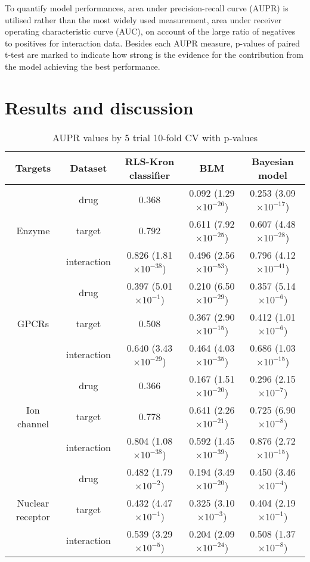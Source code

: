 \documentclass[a4paper,12pt]{report}
\begin{document}
To quantify model performances, area under precision-recall curve (AUPR) is utilised rather than the most widely used measurement, area under receiver operating characteristic curve (AUC), on account of the large ratio of negatives to positives for interaction data. Besides each AUPR measure, p-values of paired t-test are marked to indicate how strong is the evidence for the contribution from the model achieving the best performance. 

\section{Results and discussion}

\begin{table}[h]
\begin{tabular}{ccccc}\hline
Targets & Dataset & RLS-Kron classifier & BLM & Bayesian model \\ \hline
\multirow{3}{*}{Enzyme} & drug & 0.368 & 0.092 (1.29 $\times 10^{-26}$) & 0.253 (3.09 $\times 10^{-17}$) \\
& target & 0.792 & 0.611 (7.92 $\times 10^{-25}$) & 0.607 (4.48 $\times 10^{-28}$) \\
& interaction & 0.826 (1.81 $\times 10^{-38}$) & 0.496 (2.56 $\times 10^{-53}$) & 0.796 (4.12 $\times 10^{-41}$) \\ \hline
\multirow{3}{*}{GPCRs} & drug & 0.397 (5.01 $\times 10^{-1}$) & 0.210 (6.50 $\times 10^{-29}$) & 0.357 (5.14 $\times 10^{-6}$) \\
& target & 0.508 & 0.367 (2.90 $\times 10^{-15}$) & 0.412 (1.01 $\times 10^{-6}$) \\
& interaction & 0.640 (3.43 $\times 10^{-29}$) & 0.464 (4.03 $\times 10^{-35}$) & 0.686 (1.03 $\times 10^{-15}$) \\ \hline
\multirow{3}{*}{Ion channel} & drug & 0.366 & 0.167 (1.51 $\times 10^{-20}$) & 0.296 (2.15 $\times 10^{-7}$) \\
& target & 0.778 & 0.641 (2.26 $\times 10^{-21}$) & 0.725 (6.90 $\times 10^{-8}$) \\
& interaction & 0.804 (1.08 $\times 10^{-38}$) & 0.592 (1.45 $\times 10^{-39}$) & 0.876 (2.72 $\times 10^{-15}$) \\ \hline
\multirow{3}{*}{Nuclear receptor} & drug & 0.482 (1.79 $\times 10^{-2}$) & 0.194 (3.49 $\times 10^{-20}$) & 0.450 (3.46 $\times 10^{-4}$) \\
& target & 0.432 (4.47 $\times 10^{-1}$) & 0.325 (3.10 $\times 10^{-3}$) & 0.404 (2.19 $\times 10^{-1}$) \\
& interaction & 0.539 (3.29 $\times 10^{-5}$) & 0.204 (2.09 $\times 10^{-24}$) & 0.508 (1.37 $\times 10^{-8}$) \\ \hline
\end{tabular}
\caption{AUPR values by 5 trial 10-fold CV with p-values}
\end{table}
\end{document}

